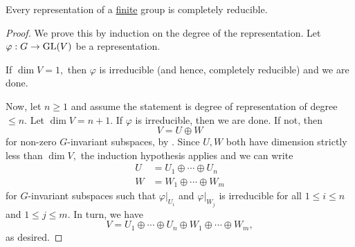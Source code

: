 \begin{thm}[Maschke] \label{thm:maschke}
	Every representation of a \underline{finite} group is completely reducible.
\end{thm}
\begin{proof} 
	We prove this by induction on the degree of the representation. Let $\varphi : G \to \operatorname{GL}(V)$ be a representation.

	If $\dim V = 1,$ then $\varphi$ is irreducible (and hence, completely reducible) and we are done.

	Now, let $n \ge 1$ and assume the statement is degree of representation of degree $\le n.$ Let $\dim V = n + 1.$ If $\varphi$ is irreducible, then we are done. If not, then
	\begin{equation*} 
		V = U \oplus W
	\end{equation*}
	for non-zero $G$-invariant subspaces, by . Since $U, W$ both have dimension strictly less than $\dim V,$ the induction hypothesis applies and we can write
	\begin{align*} 
		U &= U_1 \oplus \cdots \oplus U_n\\
		W &= W_1 \oplus \cdots \oplus W_m
	\end{align*}
	for $G$-invariant subspaces such that $\varphi|_{U_i}$ and $\varphi|_{W_j}$ is irreducible for all $1 \le i \le n$ and $1 \le j \le m.$ In turn, we have
	\begin{equation*} 
		V = U_1 \oplus \cdots \oplus U_n \oplus W_1 \oplus \cdots \oplus W_m,
	\end{equation*}
	as desired.
\end{proof}